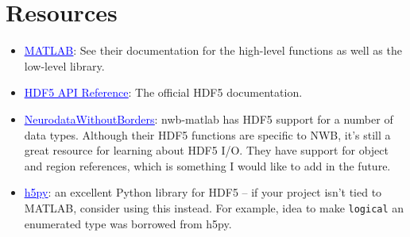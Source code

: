 \documentclass[11pt]{exam}
\newcommand\myurl[1]{\textcolor{blue}{\underline{#1}}}
\begin{document}
    \section{Resources}
    \begin{itemize}
        \item \href{https://www.mathworks.com/help/matlab/hdf5-files.html}{\myurl{MATLAB}}: See their documentation for the high-level functions as well as the low-level library.
        \item \href{https://docs.hdfgroup.org/hdf5/develop/}{\myurl{HDF5 API Reference}}: The official HDF5 documentation. 
        \item \href{https://github.com/NeurodataWithoutBorders/matnwb}{\myurl{NeurodataWithoutBorders}}: nwb-matlab has HDF5 support for a number of data types. Although their HDF5 functions are specific to NWB, it's still a great resource for learning about HDF5 I/O. They have support for object and region references, which is something I would like to add in the future. 
        \item \href{https://github.com/h5py/h5py}{\myurl{h5py}}: an excellent Python library for HDF5 -- if your project isn't tied to MATLAB, consider using this instead. For example, idea to make \texttt{logical} an enumerated type was borrowed from h5py. 
    \end{itemize}
\end{document}
